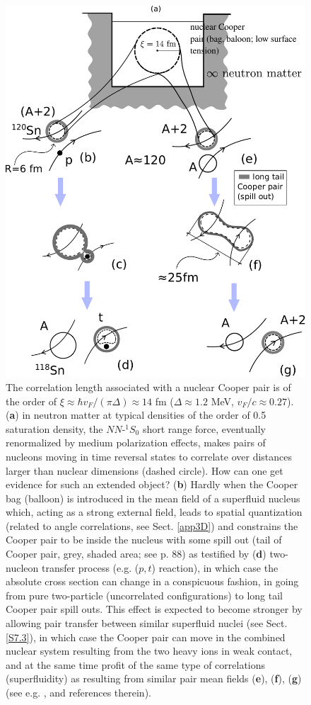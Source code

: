 \begin{figure}
	\centerline{\includegraphics*[width=12cm,angle=0]{nutshell/figs/fig_gamma.pdf}}
\caption{The correlation length associated with a nuclear Cooper pair is of the order of $\xi\approx \hbar v_F/(\pi\Delta)\approx 14 $ fm ($\Delta\approx1.2$ MeV, $v_F/c\approx0.27$).(\textbf{a}) in neutron matter at typical densities of the order of 0.5 saturation density, the $NN$-$^{1}S_0$ short range force, eventually renormalized by medium polarization effects, makes pairs of nucleons moving in time reversal states to correlate over distances larger than nuclear dimensions (dashed circle). How can one get evidence for such an extended object? (\textbf{b}) Hardly when the Cooper bag (balloon) is introduced in  the mean field  of a superfluid nucleus which, acting as a  strong external field, leads to spatial quantization (related to angle correlations, see Sect. \ref{app3D}) and constrains the Cooper pair to be inside the nucleus  with some spill out (tail of Cooper pair, grey, shaded area; see \cite{Bertsch:05} p. 88) as testified by (\textbf{d}) two-nucleon transfer process (e.g. ($p,t$) reaction), in which case the absolute cross section can change in a conspicuous fashion, in going from pure two-particle (uncorrelated configurations) to long tail Cooper pair spill outs. This effect is expected to become stronger by allowing pair transfer between similar superfluid nuclei (see Sect. \ref{S7.3}), in which case the Cooper pair can move in the combined nuclear system resulting from the two heavy ions in weak contact, and at the same time profit of the same type of correlations (superfluidity) as resulting from  similar pair mean fields (\textbf{e}), (\textbf{f}), (\textbf{g}) (see e.g. \cite{Oertzen:13,vonOertzen:01}, and references therein).}\label{fig_gamma}
\end{figure}
